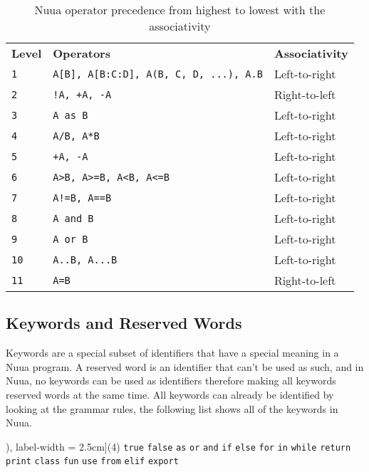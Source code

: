 \begin{table}[H]
    \centering
    \begin{tabular}{ l l l }
        \textbf{Level} & \textbf{Operators} & \textbf{Associativity} \\
        \texttt{1} & \texttt{A[B], A[B:C:D], A(B, C, D, ...), A.B} & Left-to-right \\
        \texttt{2} & \texttt{!A, +A, -A} & Right-to-left \\
        \texttt{3} & \texttt{A as B} & Left-to-right \\
        \texttt{4} & \texttt{A/B, A*B} & Left-to-right \\
        \texttt{5} & \texttt{+A, -A} & Left-to-right \\
        \texttt{6} & \texttt{A\textgreater B, A\textgreater =B, A\textless B, A\textless =B} & Left-to-right \\
        \texttt{7} & \texttt{A!=B, A==B} & Left-to-right \\
        \texttt{8} & \texttt{A and B} & Left-to-right \\
        \texttt{9} & \texttt{A or B} & Left-to-right \\
        \texttt{10} & \texttt{A..B, A...B} & Left-to-right \\
        \texttt{11} & \texttt{A=B} & Right-to-left \\
    \end{tabular}
    \caption{Nuua operator precedence from highest to lowest with the associativity}
    \label{fig:nuua_operator_precedence}
\end{table}

\subsection{Keywords and Reserved Words}

Keywords are a special subset of identifiers that have a special meaning in a Nuua program.
A reserved word is an identifier that can't be used as such, and in Nuua, no keywords can be used as identifiers therefore
making all keywords reserved words at the same time.
All keywords can already be identified by looking at the grammar rules, the following list shows
all of the keywords in Nuua.\\

\begin{tasks}[counter-format = (tsk[r]), label-width = 2.5cm](4)
        \task \texttt{true}
        \task \texttt{false}
        \task \texttt{as}
        \task \texttt{or}
        \task \texttt{and}
        \task \texttt{if}
        \task \texttt{else}
        \task \texttt{for}
        \task \texttt{in}
        \task \texttt{while}
        \task \texttt{return}
        \task \texttt{print}
        \task \texttt{class}
        \task \texttt{fun}
        \task \texttt{use}
        \task \texttt{from}
        \task \texttt{elif}
        \task \texttt{export}\\
\end{tasks}


